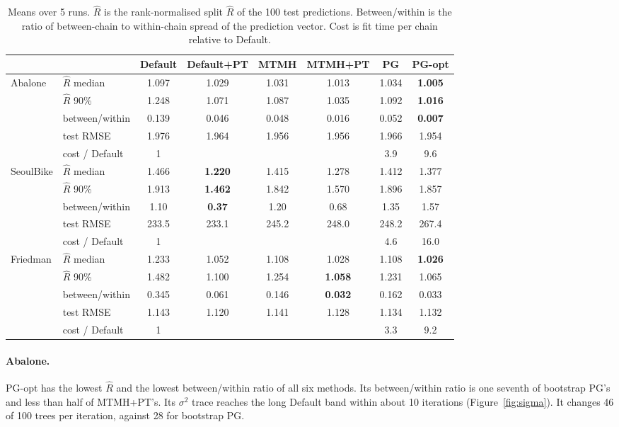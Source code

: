 \documentclass[11pt]{article}
\begin{document}
\begin{table}[ht]
\centering
\small
\begin{tabular}{llcccccc}
\toprule
 & & Default & Default+PT & MTMH & MTMH+PT & PG & PG-opt \\
\midrule
Abalone & $\hat R$ median & 1.097 & 1.029 & 1.031 & 1.013 & 1.034 & \textbf{1.005} \\
 & $\hat R$ 90\% & 1.248 & 1.071 & 1.087 & 1.035 & 1.092 & \textbf{1.016} \\
 & between/within & 0.139 & 0.046 & 0.048 & 0.016 & 0.052 & \textbf{0.007} \\
 & test RMSE & 1.976 & 1.964 & 1.956 & 1.956 & 1.966 & 1.954 \\
 & cost / Default & 1 & & & & 3.9 & 9.6 \\
\midrule
SeoulBike & $\hat R$ median & 1.466 & \textbf{1.220} & 1.415 & 1.278 & 1.412 & 1.377 \\
 & $\hat R$ 90\% & 1.913 & \textbf{1.462} & 1.842 & 1.570 & 1.896 & 1.857 \\
 & between/within & 1.10 & \textbf{0.37} & 1.20 & 0.68 & 1.35 & 1.57 \\
 & test RMSE & 233.5 & 233.1 & 245.2 & 248.0 & 248.2 & 267.4 \\
 & cost / Default & 1 & & & & 4.6 & 16.0 \\
\midrule
Friedman & $\hat R$ median & 1.233 & 1.052 & 1.108 & 1.028 & 1.108 & \textbf{1.026} \\
 & $\hat R$ 90\% & 1.482 & 1.100 & 1.254 & \textbf{1.058} & 1.231 & 1.065 \\
 & between/within & 0.345 & 0.061 & 0.146 & \textbf{0.032} & 0.162 & 0.033 \\
 & test RMSE & 1.143 & 1.120 & 1.141 & 1.128 & 1.134 & 1.132 \\
 & cost / Default & 1 & & & & 3.3 & 9.2 \\
\bottomrule
\end{tabular}
\caption{Means over 5 runs. $\hat R$ is the rank-normalised split $\hat R$ of the 100 test predictions. Between/within is the ratio of between-chain to within-chain spread of the prediction vector. Cost is fit time per chain relative to Default.}
\label{tab:main}
\end{table}

\paragraph{Abalone.}
PG-opt has the lowest $\hat R$ and the lowest between/within ratio of all six methods.
Its between/within ratio is one seventh of bootstrap PG's and less than half of MTMH+PT's.
Its $\sigma^2$ trace reaches the long Default band within about 10 iterations (Figure~\ref{fig:sigma}).
It changes 46 of 100 trees per iteration, against 28 for bootstrap PG.
\end{document}
